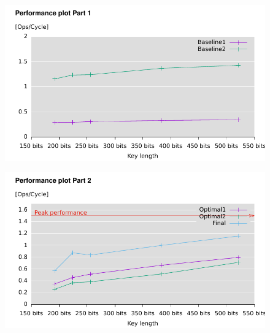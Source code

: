 \begin{frame}
\begin{figure}\flushleft		
\includegraphics[scale=0.9, trim={0 0 0 0}]{perfplot1}		
\end{figure}
\end{frame}
\begin{frame}
\begin{figure}\flushleft		
\includegraphics[scale=0.9, trim={0 0 0 0}]{perfplot2}		
\end{figure}
\end{frame}